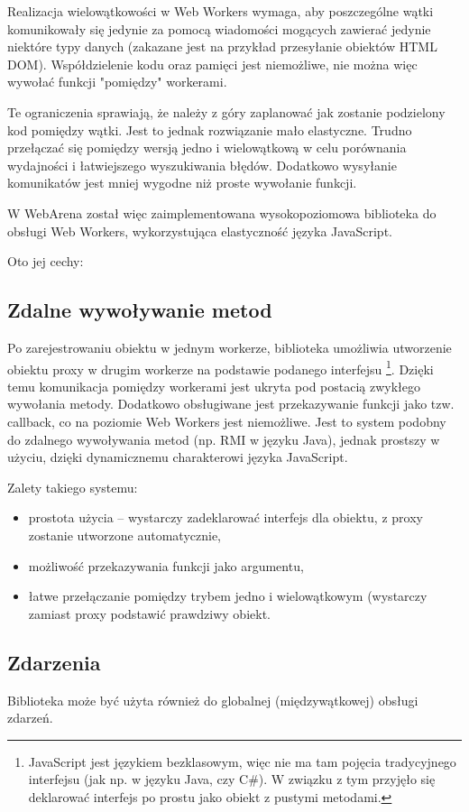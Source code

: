 Realizacja wielowątkowości w Web Workers wymaga, aby poszczególne wątki komunikowały się
jedynie za pomocą wiadomości mogących zawierać jedynie niektóre typy danych (zakazane
jest na przykład przesyłanie obiektów HTML DOM). Współdzielenie
kodu oraz pamięci jest niemożliwe, nie można więc wywołać funkcji "pomiędzy" workerami.

Te ograniczenia sprawiają, że należy z góry zaplanować jak zostanie podzielony
kod pomiędzy wątki. Jest to jednak rozwiązanie mało elastyczne. Trudno przełączać
się pomiędzy wersją jedno i wielowątkową w celu porównania wydajności i łatwiejszego
wyszukiwania błędów.
Dodatkowo wysyłanie komunikatów jest mniej wygodne niż proste wywołanie funkcji.

W WebArena został więc zaimplementowana wysokopoziomowa biblioteka do obsługi Web Workers,
wykorzystująca elastyczność języka JavaScript.

Oto jej cechy:

\subsection{Zdalne wywoływanie metod}
\label{ssec:zdalneWywolanie}
Po zarejestrowaniu obiektu w jednym workerze, biblioteka umożliwia utworzenie obiektu
proxy w drugim workerze na podstawie podanego interfejsu \footnote{JavaScript jest językiem
  bezklasowym, więc nie ma tam pojęcia tradycyjnego interfejsu (jak np. w języku Java, czy C\#).
  W związku z tym przyjęło się deklarować interfejs po prostu jako obiekt z pustymi metodami.}.
Dzięki temu komunikacja
pomiędzy workerami jest ukryta pod postacią zwykłego wywołania metody. Dodatkowo
obsługiwane jest przekazywanie funkcji jako tzw. callback, co na poziomie Web Workers
jest niemożliwe. Jest to system podobny do zdalnego wywoływania metod (np. RMI w języku Java),
jednak prostszy w użyciu, dzięki dynamicznemu charakterowi języka JavaScript.

Zalety takiego systemu:
\begin{itemize}
\item prostota użycia -- wystarczy zadeklarować interfejs dla obiektu, z proxy zostanie
  utworzone automatycznie,
\item możliwość przekazywania funkcji jako argumentu,
\item łatwe przełączanie pomiędzy trybem jedno i wielowątkowym (wystarczy zamiast proxy podstawić
  prawdziwy obiekt.
\end{itemize}

\subsection{Zdarzenia}
Biblioteka może być użyta również do globalnej (międzywątkowej) obsługi zdarzeń. 

